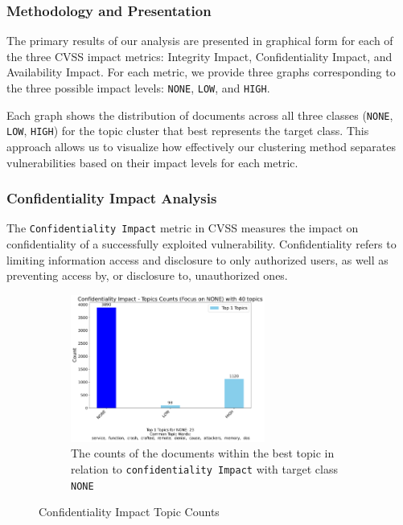 \documentclass[12pt]{article}
\begin{document}
\subsubsection*{Methodology and Presentation}

The primary results of our analysis are presented in graphical form for each of the three CVSS
impact metrics: Integrity Impact, Confidentiality Impact, and Availability Impact. For each metric,
we provide three graphs corresponding to the three possible impact levels: \texttt{NONE},
\texttt{LOW}, and \texttt{HIGH}.

Each graph shows the distribution of documents across all three classes (\texttt{NONE},
\texttt{LOW}, \texttt{HIGH}) for the topic cluster that best represents the target class. This
approach allows us to visualize how effectively our clustering method separates vulnerabilities
based on their impact levels for each metric.


\subsubsection{Confidentiality Impact Analysis}

The \texttt{Confidentiality Impact} metric in CVSS measures the impact on confidentiality of a
successfully exploited vulnerability. Confidentiality refers to limiting information access and
disclosure to only authorized users, as well as preventing access by, or disclosure to, unauthorized
ones.

\begin{figure}[h!]
	\ContinuedFloat*
	\centering
	\begin{subfigure}{\textwidth}
		\centering
		\includegraphics[width=0.7\textwidth]{figures/confidentialityImpact/merged_top_k_topics_category_focus_counts_confidentialityImpact_NONE_k1.pdf}
		\caption{The counts of the documents within the best topic in relation to \texttt{confidentiality Impact} with target class \texttt{NONE}}
		\label{fig:confidentialityImpact_60_NONE}
	\end{subfigure}

	\caption{Confidentiality Impact Topic Counts}
\end{figure}
\end{document}
